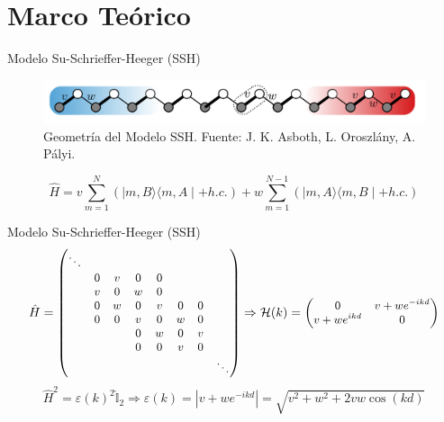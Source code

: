 \documentclass[aspectratio=43]{beamer}
\begin{document}
   \section{Marco Teórico}
   \begin{frame}{Modelo Su-Schrieffer-Heeger (SSH)}
   \begin{figure}
            \centering
            \includegraphics[width=\textwidth]{SSH model.png}
            \caption{Geometría del Modelo SSH. Fuente: J. K. Asboth, L. Oroszlány, A. Pályi.} 
            \label{Ejemplo de aislante topologico}
        \end{figure}
    \begin{equation}
        \hat{H}= v \sum_{m=1}^N (\mid m,B \rangle \langle m,A \mid + h.c.)+w\sum^{N-1}_{m=1}(\mid m,A \rangle \langle m,B \mid + h.c.)
    \end{equation}

\end{frame}
\begin{frame}{Modelo Su-Schrieffer-Heeger (SSH)}
\begin{equation}
\small
\hat{H} =
\begin{pmatrix}

\ddots  &  &  &   &  & \\ 
&0 & v & 0 & 0  &  & \\ 
&v & 0 & w & 0 &  & \\ 
&0 & w & 0 & v &0  & 0\\ 
&0 & 0 &v  & 0 &w  &0 \\ 
& &  &0  & w & 0 &v \\ 
& &  & 0 &  0& v &0 \\
& &  &  &  &  & & \ddots  
\end{pmatrix}
\Rightarrow 
 \mathcal{H}(k) = 
 \begin{pmatrix}
0 & v+w e^{-ikd}\\ 
v+w e^{ikd} & 0
\end{pmatrix} 
\end{equation}
\begin{equation}
   \hat{H}^2= \varepsilon(k)^2 \hat{\mathbb{I}}_2 \Rightarrow  \varepsilon(k) =  \left | v+w e^{-ikd} \right | = \sqrt{v^2+w^2+2vw\cos (kd)}
\end{equation}
\end{frame}
\end{document}
